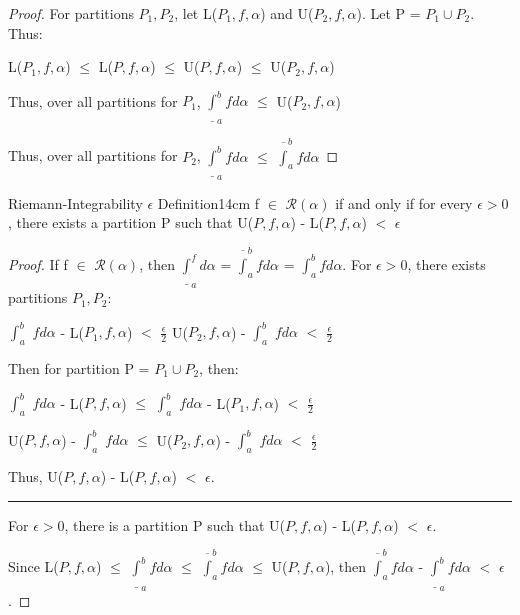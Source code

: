     \begin{proof}
        For partitions $P_1,P_2$, let L($P_1,f,\alpha$) and U($P_2,f,\alpha$).
        Let P = $P_1 \cup P_2$. Thus:

        \hspace{0.5cm}
        L($P_1,f,\alpha$)
        $\leq$ L($P,f,\alpha$)
        $\leq$ U($P,f,\alpha$)
        $\leq$ U($P_2,f,\alpha$)

        Thus, over all partitions for $P_1$,
        $\underline{\int}_a^b f d \alpha$
        $\leq$ U($P_2,f,\alpha$)

        Thus, over all partitions for $P_2$,
        $\underline{\int}_a^b f d \alpha$
        $\leq$ $\overline{\int}_a^b f d \alpha$
    \end{proof}

    \newpage



    \begin{wtheorem}{Riemann-Integrability $\epsilon$ Definition}{14cm}
        f $\in$ $\mathscr{R}(\alpha)$ if and only if for every $\epsilon > 0$,
        there exists a partition P such that
        U($P,f,\alpha$) - L($P,f,\alpha$) $<$ $\epsilon$        
    \end{wtheorem}

    \begin{proof}
        If f $\in$ $\mathscr{R}(\alpha)$, then
        $\underline{\int}_a^ f d \alpha$
        = $\overline{\int}_a^b f d \alpha$
        = $\int_a^b f d \alpha$.
        For $\epsilon > 0$, there exists partitions $P_1,P_2$:

        \hspace{0.5cm}
        $\int_a^b$ $f d \alpha$ - L($P_1,f,\alpha$) $<$ $\frac{\epsilon}{2}$
        \hspace{1cm}
        U($P_2,f,\alpha$) - $\int_a^b$ $f d \alpha$ $<$ $\frac{\epsilon}{2}$

        Then for partition P = $P_1 \cup P_2$, then:

        \hspace{0.5cm}
        $\int_a^b$ $f d \alpha$ - L($P,f,\alpha$)
        $\leq$ $\int_a^b$ $f d \alpha$ - L($P_1,f,\alpha$)
        $<$ $\frac{\epsilon}{2}$

        \hspace{0.5cm}
        U($P,f,\alpha$) - $\int_a^b$ $f d \alpha$
        $\leq$ U($P_2,f,\alpha$) - $\int_a^b$ $f d \alpha$
        $<$ $\frac{\epsilon}{2}$

        Thus, U($P,f,\alpha$) - L($P,f,\alpha$) $<$ $\epsilon$.

        \rule[0.1cm]{15cm}{0.01cm}

        For $\epsilon > 0$, there is a partition P such that
        U($P,f,\alpha$) - L($P,f,\alpha$) $<$ $\epsilon$.

        Since L($P,f,\alpha$) $\leq$ $\underline{\int}_a^b f d \alpha$
        $\leq$ $\overline{\int}_a^b f d \alpha$ $\leq$ U($P,f,\alpha$), then
        $\overline{\int}_a^b f d \alpha$ - $\underline{\int}_a^b f d \alpha$
        $<$ $\epsilon$.
    \end{proof}


